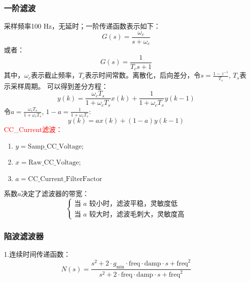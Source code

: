     \subsubsection*{一阶滤波}
        采样频率100 Hz，无延时；一阶传递函数表示如下：
            \begin{equation}
                G(s) = \frac{\omega_c}{s+\omega_c}
                \label{eq:CC2}
            \end{equation}
        或者：
            \begin{equation}
                G(s) = \frac{1}{T_cs+1}
                \label{eq:CC3}
            \end{equation}
        其中，$\omega_c$表示截止频率，$T_c$表示时间常数。离散化，后向差分，令$s = \frac{1-z^{-1}}{T_s}$, $T_s$表示采样周期。
        可以得到差分方程：
            \begin{equation}
                y(k) = \frac{\omega_cT_s}{1+\omega_cT_s}x(k)+\frac{1}{1+\omega_cT_s}y(k-1)
            \end{equation}
        令$a = \frac{\omega_cT_s}{1+\omega_cT_s}$, $1-a = \frac{1}{1+\omega_cT_s} $:
            \begin{equation}
                y(k) = ax(k)+(1-a)y(k-1)
                \label{eq:CC4}
            \end{equation}
        \textcolor{red}{CC\_Current滤波：}
            \begin{enumerate}[label={}]
                \item $y = \mathrm{Samp\_CC\_Voltage} $;
                \item $x = \mathrm{Raw\_CC\_Voltage} $;
                \item $a = \mathrm{CC\_Current\_FilterFactor}$
            \end{enumerate}
        系数$a$决定了滤波器的带宽：
            \begin{equation}
                \begin{cases}
                    \text{当 $a$ 较小时，滤波平稳，灵敏度低}\\
                    \text{当 $a$ 较大时，滤波毛刺大，灵敏度高}
                \end{cases}
            \end{equation}

        \subsubsection*{陷波滤波器}
            1.连续时间传递函数：
                \begin{equation}
                    N(s) = \frac{s^2 + 2\cdot g_\mathrm{min} \cdot \mathrm{freq} \cdot \mathrm{damp}\cdot s + \mathrm{freq}^2}{s^2 + 2\cdot \mathrm{freq} \cdot \mathrm{damp} \cdot s + \mathrm{freq}^2}
                    \label{eq:Cxb}
                \end{equation}
          
